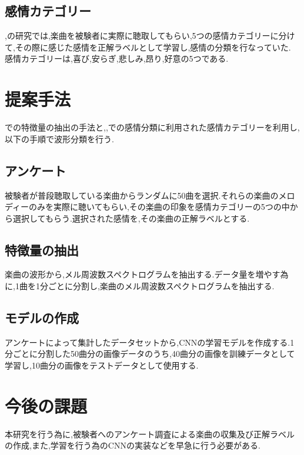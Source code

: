 \documentclass[twocolumn,twoside,9.5pt]{jarticle}
\begin{document}
\subsection{感情カテゴリー}
\cite{gushiken1},\cite{gushiken2}の研究では,楽曲を被験者に実際に聴取してもらい,5つの感情カテゴリーに分けて,その際に感じた感情を正解ラベルとして学習し,感情の分類を行なっていた.\\
感情カテゴリーは,喜び,安らぎ,悲しみ,昂り,好意の5つである.

\section{提案手法}
\cite{deep}での特徴量の抽出の手法と,\cite{gushiken1},\cite{gushiken2}での感情分類に利用された感情カテゴリーを利用し,以下の手順で波形分類を行う.

\subsection{アンケート}
被験者が普段聴取している楽曲からランダムに50曲を選択.それらの楽曲のメロディーのみを実際に聴いてもらい,その楽曲の印象を感情カテゴリーの5つの中から選択してもらう.選択された感情を,その楽曲の正解ラベルとする.\\

\subsection{特徴量の抽出}
楽曲の波形から,メル周波数スペクトログラムを抽出する.データ量を増やす為に,1曲を1分ごとに分割し,楽曲のメル周波数スペクトログラムを抽出する.\\

\subsection{モデルの作成}
アンケートによって集計したデータセットから,CNNの学習モデルを作成する.1分ごとに分割した50曲分の画像データのうち,40曲分の画像を訓練データとして学習し,10曲分の画像をテストデータとして使用する.\\


\section{今後の課題}
本研究を行う為に,被験者へのアンケート調査による楽曲の収集及び正解ラベルの作成,また,学習を行う為のCNNの実装などを早急に行う必要がある.\\
\end{document}
